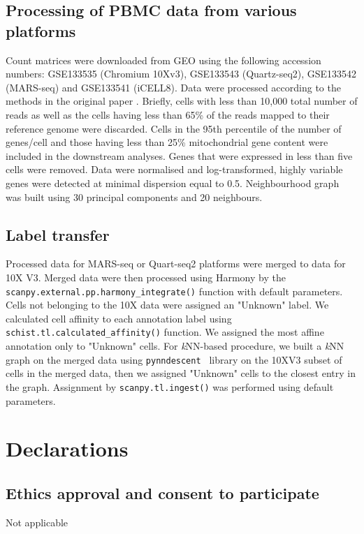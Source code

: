 \documentclass[10pt]{article}
\begin{document}
\subsection*{Processing of PBMC data from various platforms}
Count matrices were downloaded from GEO using the following accession numbers: GSE133535 (Chromium 10Xv3), GSE133543 (Quartz-seq2), GSE133542 (MARS-seq) and GSE133541 (iCELL8). Data were processed according to the methods in the original paper \cite{mereu_2020}. Briefly, cells with less than 10,000 total number of reads as well as the cells having less than 65\% of the reads mapped to their reference genome were discarded. Cells in the 95th percentile of the number of genes/cell and those having less than 25\% mitochondrial gene content were included in the downstream analyses. Genes that were expressed in less than five cells were removed. Data were normalised and log-transformed, highly variable genes were detected at minimal dispersion equal to 0.5. Neighbourhood graph was built using 30 principal components and 20 neighbours. 


\subsection*{Label transfer}

Processed data for MARS-seq or Quart-seq2 platforms were merged to data for 10X V3. Merged data were then processed using Harmony \cite{Korsunsky_2019} by the \texttt{scanpy.external.pp.harmony\_integrate()} function with default parameters. Cells not belonging to the 10X data were assigned an "Unknown" label. We calculated cell affinity to each annotation label using \texttt{schist.tl.calculated\_affinity()} function. We assigned the most affine annotation only to "Unknown" cells. For \emph{k}NN-based procedure, we built a \emph{k}NN graph on the merged data using \texttt{pynndescent } library on the 10XV3 subset of cells in the merged data, then we assigned "Unknown" cells to the closest entry in the graph. Assignment by \texttt{scanpy.tl.ingest()} was performed using default parameters.


\section*{Declarations}

\subsection*{Ethics approval and consent to participate}
Not applicable
\end{document}

